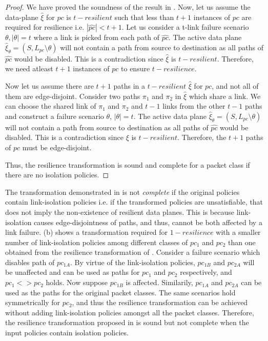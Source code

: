 \iffull
	\begin{proof}
		We have proved the soundness of the result in . 
		Now, let us assume the data-plane $\hat{\xi}$ for $pc$ is $t-resilient$ such 
		that less than $t+1$ instances of $pc$ are required for resilience i.e. 
		$|\hat{pc}| < t+1$. Let us consider a 
		t-link failure scenario $\theta, |\theta| = t$ where a link is picked from
		each path of $\hat{pc}$. The active data plane
		$\hat{\xi}_\theta = (S, L_{pc} \setminus \theta)$ will not contain a
		path from source to destination as all paths of $\hat{pc}$ would be disabled.  
		This is a contradiction since $\hat{\xi}$ is $t-resilient$. 
		Therefore, we need atleast $t+1$ instances of $pc$ to ensure $t-resilience$.
		
		Now let us assume there are $t+1$ paths in a $t-resilient$ $\hat{\xi}$ for $pc$,
		and not all of them are edge-disjoint. Consider two paths $\pi_1$ and $\pi_2$
		in $\hat{\xi}$ which share a link. We can choose the shared link 
		of $\pi_1$ and $\pi_2$ and $t-1$ links from the other $t-1$ paths 
		and construct a failure scenario $\theta$, $|\theta| = t$.
		The active data plane
		$\hat{\xi}_\theta = (S, L_{pc} \setminus \theta)$ will not contain a
		path from source to destination as all paths of $\hat{pc}$ would be disabled.  
		This is a contradiction since $\xi$ is $t-resilient$. Therefore,
		the $t+1$ paths of $pc$ must be edge-disjoint. 
		
		\noindent Thus, the resilience transformation is sound and complete for a  
		packet class if there are no isolation policies.
	\end{proof}
\fi
\noindent The transformation demonstrated in  is not \emph{complete}
 if the original policies contain link-isolation policies i.e. if the transformed policies
 are unsatisfiable, 
 that does not imply the non-existence of resilient data planes. 
 This is because link-isolation causes edge-disjointness of paths,
 and thus, cannot be both affected by a link failure. 
 (b) shows a transformation required for $1-resilience$ 
 with a smaller number of link-isolation policies among different classes
 of $pc_1$ and $pc_2$ than one obtained from 
 the resilience transformation of . 
 Consider a failure scenario which disables path
 of $pc_{1A}$. By virtue of the link-isolation policies, $pc_{1B}$ and
 $pc_{2A}$ will be unaffected and can be used as paths for $pc_1$ 
 and $pc_2$ respectively, and $pc_1 <> pc_2$ holds. Now suppose
 $pc_{1B}$ is affected. Similarily, $pc_{1A}$ and $pc_{2A}$ can be used as
 the paths for the original packet classes. The same scenarios hold symmetrically
 for $pc_2$, and thus the resilience transformation can be achieved without
 adding link-isolation policies amongst all the packet classes. Therefore,
 the resilience transformation proposed in  is sound but not
 complete when the input policies contain isolation policies. 
 
